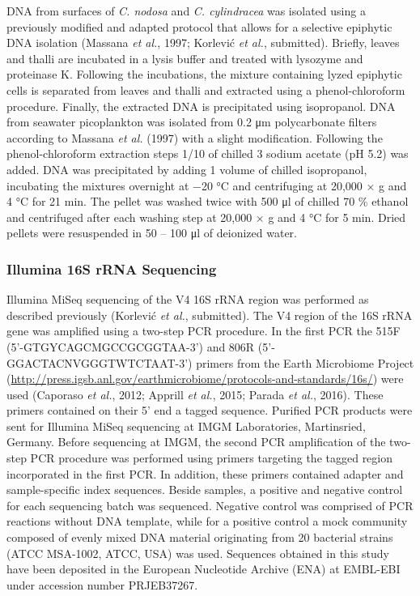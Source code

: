 \documentclass[12pt,]{article}
\begin{document}
DNA from surfaces of \emph{C. nodosa} and \emph{C. cylindracea} was
isolated using a previously modified and adapted protocol that allows
for a selective epiphytic DNA isolation (Massana \emph{et al.}, 1997;
Korlević \emph{et al.}, submitted). Briefly, leaves and thalli are
incubated in a lysis buffer and treated with lysozyme and proteinase K.
Following the incubations, the mixture containing lyzed epiphytic cells
is separated from leaves and thalli and extracted using a
phenol-chloroform procedure. Finally, the extracted DNA is precipitated
using isopropanol. DNA from seawater picoplankton was isolated from 0.2
\si{\um} polycarbonate filters according to Massana \emph{et al.} (1997)
with a slight modification. Following the phenol-chloroform extraction
steps 1/10 of chilled 3 \si{\Molar} sodium acetate (pH 5.2) was added.
DNA was precipitated by adding 1 volume of chilled isopropanol,
incubating the mixtures overnight at \num{-20} \si{\degreeCelsius} and
centrifuging at 20,000 × g and 4 \si{\degreeCelsius} for 21
\si{\minute}. The pellet was washed twice with 500 \si{\ul} of chilled
70 \si{\percent} ethanol and centrifuged after each washing step at
20,000 × g and 4 \si{\degreeCelsius} for 5 \si{\minute}. Dried pellets
were resuspended in 50 -- 100 \si{\ul} of deionized water.

\hypertarget{illumina-16s-rrna-sequencing}{%
\subsubsection{Illumina 16S rRNA
Sequencing}\label{illumina-16s-rrna-sequencing}}

Illumina MiSeq sequencing of the V4 16S rRNA region was performed as
described previously (Korlević \emph{et al.}, submitted). The V4 region
of the 16S rRNA gene was amplified using a two-step PCR procedure. In
the first PCR the 515F (5'-GTGYCAGCMGCCGCGGTAA-3') and 806R
(5'-GGACTACNVGGGTWTCTAAT-3') primers from the Earth Microbiome Project
(\url{http://press.igsb.anl.gov/earthmicrobiome/protocols-and-standards/16s/})
were used (Caporaso \emph{et al.}, 2012; Apprill \emph{et al.}, 2015;
Parada \emph{et al.}, 2016). These primers contained on their 5' end a
tagged sequence. Purified PCR products were sent for Illumina MiSeq
sequencing at IMGM Laboratories, Martinsried, Germany. Before sequencing
at IMGM, the second PCR amplification of the two-step PCR procedure was
performed using primers targeting the tagged region incorporated in the
first PCR. In addition, these primers contained adapter and
sample-specific index sequences. Beside samples, a positive and negative
control for each sequencing batch was sequenced. Negative control was
comprised of PCR reactions without DNA template, while for a positive
control a mock community composed of evenly mixed DNA material
originating from 20 bacterial strains (ATCC MSA-1002, ATCC, USA) was
used. Sequences obtained in this study have been deposited in the
European Nucleotide Archive (ENA) at EMBL-EBI under accession number
PRJEB37267.
\end{document}
